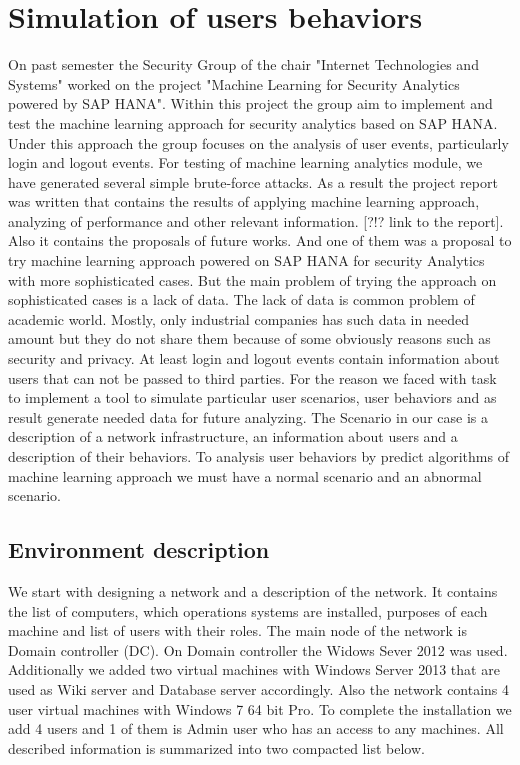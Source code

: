 \section{Simulation of users behaviors}
On past semester the Security Group of the chair "Internet Technologies and Systems" worked on the project "Machine Learning for Security Analytics powered by SAP HANA". Within this project the group aim to implement and test the machine learning approach for security analytics based on SAP HANA. Under this approach the group focuses on the analysis of user events, particularly login and logout events. For testing of machine learning analytics module, we have generated several simple brute-force attacks. As a result the project report was written that contains the results of applying machine learning approach, analyzing of performance and other relevant information. [?!? link to the report]. Also it contains the proposals of future works. And one of them was a proposal to try machine learning approach powered on SAP HANA for security Analytics with more sophisticated cases. But the main problem of trying the approach on sophisticated cases is a lack of data. The lack of data is common problem of academic world. Mostly, only industrial companies has such data in needed amount but they do not share them because of some obviously reasons such as security and privacy. At least login and logout events contain information about users that can not be passed to third parties. For the reason we faced with task to implement a tool to simulate particular user scenarios, user behaviors and as result generate needed data for future analyzing. 
The Scenario in our case is a description of a network infrastructure, an information about users and a description of their behaviors. To analysis user behaviors by predict algorithms of machine learning approach we must have a normal scenario and an abnormal scenario.  
  
\subsection{Environment description}
We start with designing a network and a description of the network. It contains the list of computers, which operations systems are installed, purposes of each machine and list of users with their roles. The main node of the network is Domain controller (DC). On Domain controller the Widows Sever 2012 was used. Additionally we added two virtual machines with Windows Server 2013 that are used as Wiki server and Database server accordingly. Also the network contains 4 user virtual machines with Windows 7 64 bit Pro. To complete the installation we add 4 users and 1 of them is Admin user who has an access to any machines. All described information is summarized into two compacted list below. 

